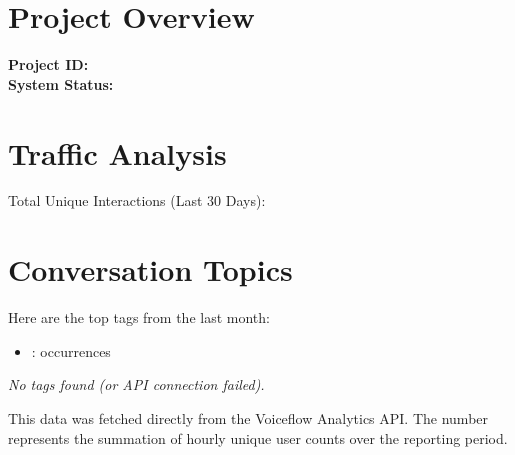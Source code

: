 \documentclass{article}
\title{\VAR{ title_var }}
\date{\VAR{ report_date }}
\author{Automated Analytics}
\begin{document}
\maketitle

\section{Project Overview}
\textbf{Project ID:} \texttt{} \\
\textbf{System Status:} 

\section{Traffic Analysis}
\begin{center}
    \huge
    Total Unique Interactions (Last 30 Days): \\
    \vspace{0.5cm}
    \textbf{\textcolor{blue}{}}
\end{center}

\vspace{1cm}

\section{Conversation Topics}
    Here are the top tags from the last month:
    \begin{itemize}
            \item \textbf{}:  occurrences
    \end{itemize}
    \textit{No tags found (or API connection failed).}

\noindent This data was fetched directly from the Voiceflow Analytics API. 
The number represents the summation of hourly unique user counts over the reporting period.
\end{document}
